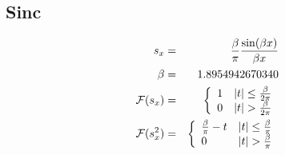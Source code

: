 \documentclass[12pt]{article}
\begin{document}
\subsection{Sinc}

\begin{eqnarray}
s_{x} &=& \frac{\beta}{\pi} \frac{\sin(\beta x)}{\beta x}\\
\beta &=& 1.8954942670340\\
{\cal F}(s_{x}) &=& \left\{
              \begin{array}{ll} 1 & |t| \le \frac{\beta}{2\pi}\\
                                0 & |t|   > \frac{\beta}{2\pi}\\
              \end{array}
        \right.\\
{\cal F}(s_{x}^2) &=& \left\{
                     \begin{array}{ll} \frac{\beta}{\pi} - t & |t| \le \frac{\beta}{\pi}\\
                                                           0 & |t|   > \frac{\beta}{\pi}\\
                     \end{array}
                  \right.
\end{eqnarray}
\end{document}

